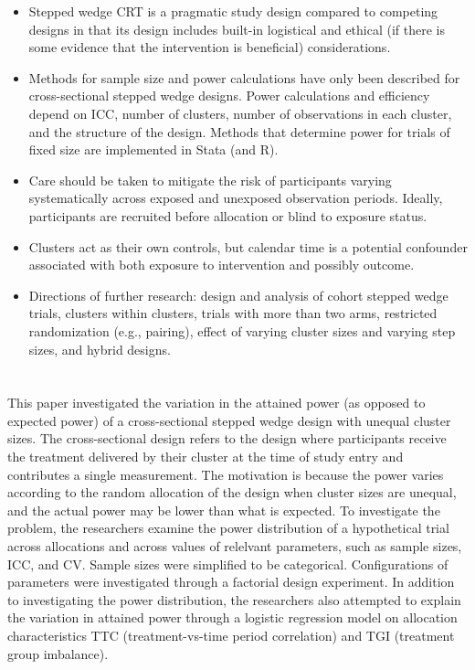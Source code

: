 \documentclass{article}
\begin{document}
\begin{itemize}

\item
Stepped wedge CRT is a pragmatic study design compared to competing designs in that its design includes built-in logistical and ethical (if there is some evidence that the intervention is beneficial) considerations.

\item
Methods for sample size and power calculations have only been described for cross-sectional stepped wedge designs. Power calculations and efficiency depend on ICC, number of clusters, number of observations in each cluster, and the structure of the design. Methods that determine power for trials of fixed size are implemented in Stata (and R).

\item
Care should be taken to mitigate the risk of participants varying systematically across exposed and unexposed observation periods. Ideally, participants are recruited before allocation or blind to exposure status.

\item
Clusters act as their own controls, but calendar time is a potential confounder associated with both exposure to intervention and possibly outcome.

\item
Directions of further research: design and analysis of cohort stepped wedge trials, clusters within clusters, trials with more than two arms, restricted randomization (e.g., pairing), effect of varying cluster sizes and varying step sizes, and hybrid designs.

\end{itemize}


\newpage


\section{\textcite{Ouyang:2020}}

This paper investigated the variation in the attained power (as opposed to expected power) of a cross-sectional stepped wedge design with unequal cluster sizes. The cross-sectional design refers to the design where participants receive the treatment delivered by their cluster at the time of study entry and contributes a single measurement. The motivation is because the power varies according to the random allocation of the design when cluster sizes are unequal, and the actual power may be lower than what is expected. To investigate the problem, the researchers examine the power distribution of a hypothetical trial across allocations and across values of relelvant parameters, such as sample sizes, ICC, and CV. Sample sizes were simplified to be categorical. Configurations of parameters were investigated through a factorial design experiment. In addition to investigating the power distribution, the researchers also attempted to explain the variation in attained power through a logistic regression model on allocation characteristics TTC (treatment-vs-time period correlation) and TGI (treatment group imbalance).
\\
\end{document}
